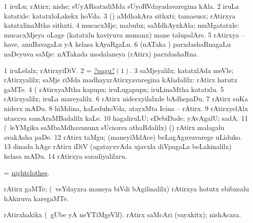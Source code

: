 \bentry
{}
\gl{\nA}
\bmng
\bnum
\num{1} iruLu; rAtirx; nishe; sUyARsatxdiMda sUyoRVdayadavaregina kAla. 
\num{2} iruLa katatxle:  katatxloLakekx hoVda. 
\num{3} (\alaMshA) aMdhakAra sithxti; tamasusx; rAtirxya katatxlinaMtha sithxti. 
\num{4} mucacxMje; mabubx; saMdhAyxkAla; muMgatatxle:  mucacxMjeya oLage (katatxlu kaviyuva munanx) mane talupalAre. 
\num{5} rAtirxya -- have, anuBavagaLu yA kelasa kAyaRgaLu. 
\num{6} (nATaka \mo) parxdashaRnagaLu naDeyuva saMje:  nATakada modalaneya (rAtirx) parxdashaRna. 
\enum
\emng

\noindent
\gl{\pagu}
\bmng
\hypertarget{night pagu1}{} 
\bnum
\num{1}  iruLelalx; rAtirxyiDiV. 
\num{2}  = \hyperlink{night pagu1}{?pagu?\((1)\)}. 
\num{3}  saMjeyalilx; katatxlAda meVle; rAtirxyalilx; saMje riMda madhayxrAtirxyavaregina kAladalilx: rAtirx hatutx gaMTe. 
\num{4}  (  rAtirxyaMtha kapupx; iruLugapupx; iruLinaMtha katatxlu. 
\num{5}  rAtirxyalilx; iruLa mareyalilx. 
\num{6}  rAtirx niderxyilalxde bAdhepaDu. 
\num{7}  rAtirx suKa niderx mADu. 
\num{8}  hiMdina, kaLeduhoVda, atayxMta Icina -- rAtirx. 
\num{9}  rAtirxyelAlx utasxva samAraMBadalilx kaLe. 
\num{10}  hagaliruLU; eDebiDade; yAvAgalU; sadA. 
\num{11}  (\sA\ leYMgika saMbaMdhavanunx sUcisuva athaRdalilx) (\kanmu) rAtirx malagalu avakAsha paDe. 
\num{12}  rAtirx taMgu; (maneyiMdAce) beLagAguvavarege uLiduko. 
\num{13}  dinada hAge rAtirx iDiV (agatayxvAda ujavxla diVpagaLa beLakinalilx) kelasa mADu. 
\num{14}  rAtirxya saradiyalilxru. 
\enum
\emng
\eentry

\bentry
{}
\gl{\nA}
\bmng
= \hyperlink{nightclothes}{nightclothes}. 
\emng
\eentry

\bentry
{}
\gl{\nA}
\bmng
rAtirx gaMTe; (\kanmu\ veYdayxra maneya biVdi bAgilinalilx) rAtirxya hotutx ebibxsalu hAkiruva karegaMTe. 
\emng
\eentry

\bentry
{}
\gl{\nA}
\bmng
\banum
{} rAtirxhakikx (\kanmu\ gUbe yA neYTiMgeVlf). 
 rAtirx saMcAri (vayxkitx); nishAcara. 
\eanum
\emng
\eentry


